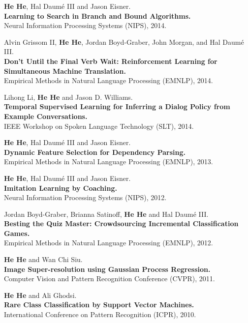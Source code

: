 \documentclass[margin,line]{resume}
\begin{document}
\begin{resume}
{\bf He He}, Hal Daum\'e III and Jason Eisner. \\
{\bf Learning to Search in Branch and Bound Algorithms.}\\
Neural Information Processing Systems (NIPS), 2014.%

Alvin Grissom II, {\bf He He}, Jordan Boyd-Graber, John Morgan, and Hal Daum\'e III. \\
{\bf Don't Until the Final Verb Wait: Reinforcement Learning for Simultaneous Machine Translation.}\\
Empirical Methods in Natural Language Processing (EMNLP), 2014.%

Lihong Li, {\bf He He} and Jason D. Williams. \\
{\bf Temporal Supervised Learning for Inferring a Dialog Policy from Example Conversations.}\\
IEEE Workshop on Spoken Language Technology (SLT), 2014.%

{\bf He He}, Hal Daum\'e III and Jason Eisner.\\
{\bf Dynamic Feature Selection for Dependency Parsing.}\\ 
Empirical Methods in Natural Language Processing (EMNLP), 2013.%

{\bf He He}, Hal Daum\'e III and Jason Eisner.\\
{\bf Imitation Learning by Coaching.}\\ 
Neural Information Processing Systems (NIPS), 2012.%

Jordan Boyd-Graber, Brianna Satinoff, {\bf He He} and Hal Daum\'e III.\\
{\bf Besting the Quiz Master: Crowdsourcing Incremental Classification Games.}\\
Empirical Methods in Natural Language Processing (EMNLP), 2012.%

{\bf He He} and Wan Chi Siu. \\
{\bf Image Super-resolution using Gaussian Process Regression.}\\
Computer Vision and Pattern Recognition Conference (CVPR), 2011.%

{\bf He He} and Ali Ghodsi. \\
{\bf Rare Class Classification by Support Vector Machines.}\\
International Conference on Pattern Recognition (ICPR), 2010.


\end{resume}
\end{document}
